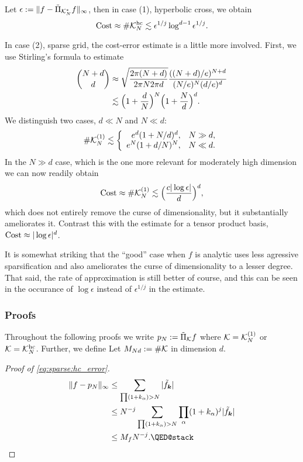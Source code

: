 Let $\epsilon := \| f - \tilde\Pi_{\mathcal{K}_N^{*}} f \|_\infty$, then  in 
case (1), hyperbolic cross, we obtain 
\[
    {\rm Cost} \approx \#\mathcal{K}_N^{\rm hc} 
    \lesssim \epsilon^{1/j} \log^{d-1} \epsilon^{1/j}.
\]

In case (2), sparse grid, the cost-error estimate is a little more involved. 
First, we use Stirling's formula to estimate 
\begin{align*}
    {N+d \choose d} &\approx \sqrt{\frac{2\pi (N+d)}{2\pi N 2\pi d}} 
            \frac{ ((N+d)/e)^{N+d}}{(N/e)^N (d/e)^d} \\ 
    &\lesssim 
    \Big(1+\frac{d}{N}\Big)^N \Big(1+\frac{N}{d}\Big)^d.
\end{align*}
We distinguish two cases, $d \ll N$ and $N \ll d$:
\[
    \#\mathcal{K}_N^{(1)} \lesssim 
    \left\{\begin{array}{rl}
        e^d (1+N/d)^d, & N \gg d, \\ 
        e^N (1+d/N)^N, & N \ll d. 
    \end{array} \right. 
\]
In the $N \gg d$ case, which is the one more relevant for moderately high
dimension we can now readily obtain 
\[
    {\rm Cost} \approx \#\mathcal{K}_N^{(1)}  \lesssim 
    \Big( \frac{c |\log \epsilon|}{d}\Big)^d,
\]
which does not entirely remove the curse of dimensionality, but it substantially 
ameliorates it. Contrast this with the estimate for a tensor product  
basis, ${\rm Cost} \approx |\log \epsilon|^d$.


It is somewhat striking that the ``good'' case when $f$ is analytic uses less
agressive sparsification and also ameliorates the curse of dimensionality to a
lesser degree. That said, the rate of approximation is still better of course, 
and this can be seen in the occurance of $\log \epsilon$ instead of 
$\epsilon^{1/j}$ in the estimate.

\subsubsection{Proofs}

Throughout the following proofs we write $p_N := \tilde\Pi_{\mathcal{K}}f$ where
$\mathcal{K} = \mathcal{K}_N^{(1)}$ or $\mathcal{K} = \mathcal{K}_N^{\rm hc}$. Further, we define Let
$M_{Nd} := \#\mathcal{K}$ in dimension $d$.

\begin{proof}[Proof of \eqref{eq:sparse:hc_error}]
    \begin{align*}
        \|f - p_N\|_\infty
        &\leq 
        \sum_{\prod (1+k_\alpha)>N} |\tilde{f}_\bk| \\ 
        &\leq
        N^{-j} 
        \sum_{\prod (1+k_\alpha)>N}  \prod_\alpha (1+k_\alpha)^j |\tilde{f}_\bk| \\ 
        &\leq 
        M_f N^{-j}. \qedhere 
    \end{align*}
\end{proof}

